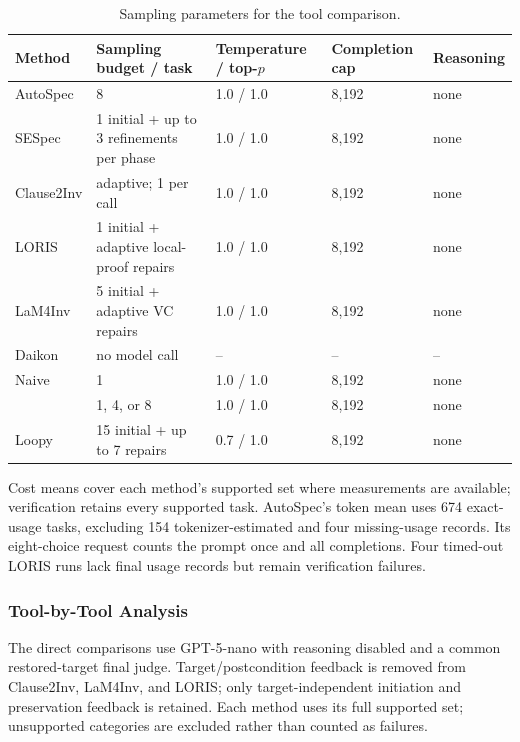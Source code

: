 \begin{table}[H]
\centering
\caption{Sampling parameters for the tool comparison.}
\label{tab:tool-sampling-parameters}
\begin{tabular}{lllll}
\toprule
\rowcolor{algobg}
Method & Sampling budget / task & Temperature / top-\(p\) & Completion cap & Reasoning \\
\midrule
AutoSpec & 8 & 1.0 / 1.0 & 8,192 & none \\
SESpec & 1 initial + up to 3 refinements per phase & 1.0 / 1.0 & 8,192 & none \\
Clause2Inv & adaptive; 1 per call & 1.0 / 1.0 & 8,192 & none \\
LORIS & 1 initial + adaptive local-proof repairs & 1.0 / 1.0 & 8,192 & none \\
LaM4Inv & 5 initial + adaptive VC repairs & 1.0 / 1.0 & 8,192 & none \\
Daikon & no model call & -- & -- & -- \\
Naive & 1 & 1.0 / 1.0 & 8,192 & none \\
\sam{} & 1, 4, or 8 & 1.0 / 1.0 & 8,192 & none \\
Loopy & 15 initial + up to 7 repairs & 0.7 / 1.0 & 8,192 & none \\
\bottomrule
\end{tabular}
\end{table}

Cost means cover each method's supported set where measurements are available;
verification retains every supported task. AutoSpec's token mean uses 674
exact-usage tasks, excluding 154 tokenizer-estimated and four missing-usage
records. Its eight-choice request counts the prompt once and all completions.
Four timed-out LORIS runs lack final usage records but remain verification
failures. 

\subsubsection{Tool-by-Tool Analysis}

The direct comparisons use GPT-5-nano with reasoning disabled and a common
restored-target final judge. Target/postcondition feedback is removed from
Clause2Inv, LaM4Inv, and LORIS; only target-independent initiation and
preservation feedback is retained. Each method uses its full supported
set; unsupported categories are excluded rather than counted as failures.

